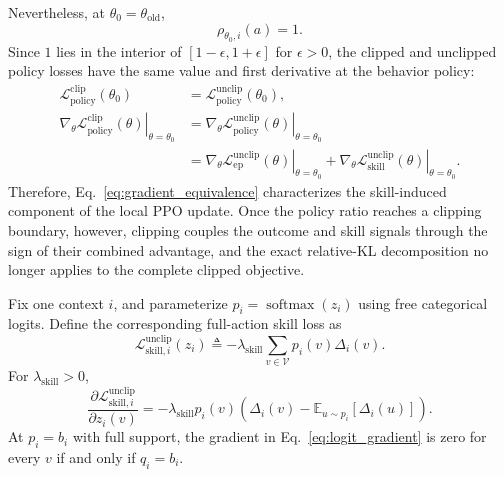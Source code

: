 Nevertheless, at
\(\theta_0=\theta_{\mathrm{old}}\),
\[
 \rho_{\theta_0,i}(a)=1.
\]
Since \(1\) lies in the interior of
\([1-\epsilon,1+\epsilon]\) for \(\epsilon>0\), the clipped and unclipped
policy losses have the same value and first derivative at the behavior
policy:
\begin{equation*}
\begin{aligned}
 \mathcal L_{\mathrm{policy}}^{\mathrm{clip}}(\theta_0)
 &=
 \mathcal L_{\mathrm{policy}}^{\mathrm{unclip}}(\theta_0),
 \\
 \left.
 \nabla_\theta
 \mathcal L_{\mathrm{policy}}^{\mathrm{clip}}(\theta)
 \right|_{\theta=\theta_0}
 &=
 \left.
 \nabla_\theta
 \mathcal L_{\mathrm{policy}}^{\mathrm{unclip}}(\theta)
 \right|_{\theta=\theta_0}
 \\
 &=
 \left.
 \nabla_\theta
 \mathcal L_{\mathrm{ep}}^{\mathrm{unclip}}(\theta)
 \right|_{\theta=\theta_0}
 +
 \left.
 \nabla_\theta
 \mathcal L_{\mathrm{skill}}^{\mathrm{unclip}}(\theta)
 \right|_{\theta=\theta_0}.
\end{aligned}
\end{equation*}
Therefore,
Eq.~\ref{eq:gradient_equivalence} characterizes the skill-induced
component of the local PPO update. Once the policy ratio reaches a clipping
boundary, however, clipping couples the outcome and skill signals through
the sign of their combined advantage, and the exact relative-KL
decomposition no longer applies to the complete clipped objective.


\begin{corollary}
\label{cor:dense_signal}
Fix one context \(i\), and parameterize
\(p_i=\operatorname{softmax}(z_i)\) using free categorical logits. Define
the corresponding full-action skill loss as
\begin{equation*}
 \mathcal L_{\mathrm{skill},i}^{\mathrm{unclip}}(z_i)
 \triangleq
 -
 \lambda_{\mathrm{skill}}
 \sum_{v\in\mathcal V}
 p_i(v)\Delta_i(v).
\end{equation*}
For \(\lambda_{\mathrm{skill}}>0\),
\begin{equation}
 \frac{
   \partial
   \mathcal L_{\mathrm{skill},i}^{\mathrm{unclip}}
 }{
   \partial z_i(v)
 }
 =
 -
 \lambda_{\mathrm{skill}}
 p_i(v)
 \left(
   \Delta_i(v)
   -
   \mathbb E_{u\sim p_i}[\Delta_i(u)]
 \right).
\label{eq:logit_gradient}
\end{equation}
At \(p_i=b_i\) with full support, the gradient in
Eq.~\ref{eq:logit_gradient} is zero for every \(v\) if and only if
\(q_i=b_i\).
\end{corollary}


